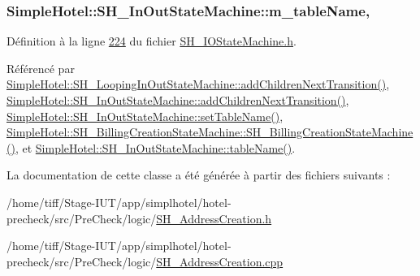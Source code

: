 \hypertarget{classSimpleHotel_1_1SH__InOutStateMachine_a15c063debdaa4c87bd4925867a13ce9e}{
\subsubsection[{m\-\_\-table\-Name}]{\setlength{\rightskip}{0pt plus 5cm}Simple\-Hotel\-::\-S\-H\-\_\-\-In\-Out\-State\-Machine\-::m\-\_\-table\-Name\hspace{0.3cm}{\ttfamily [protected]}, {\ttfamily [inherited]}}}\label{classSimpleHotel_1_1SH__InOutStateMachine_a15c063debdaa4c87bd4925867a13ce9e}


Définition à la ligne \hyperlink{SH__IOStateMachine_8h_source_l00224}{224} du fichier \hyperlink{SH__IOStateMachine_8h_source}{S\-H\-\_\-\-I\-O\-State\-Machine.\-h}.



Référencé par \hyperlink{classSimpleHotel_1_1SH__LoopingInOutStateMachine_a2ac2ff43d97fd1b12e1b30d6818f33e4}{Simple\-Hotel\-::\-S\-H\-\_\-\-Looping\-In\-Out\-State\-Machine\-::add\-Children\-Next\-Transition()}, \hyperlink{classSimpleHotel_1_1SH__InOutStateMachine_aaf5afe04d6e4d3d5ebf0b5f1b00eddf1}{Simple\-Hotel\-::\-S\-H\-\_\-\-In\-Out\-State\-Machine\-::add\-Children\-Next\-Transition()}, \hyperlink{classSimpleHotel_1_1SH__InOutStateMachine_adae23a212e9ba1e590f062994cd367a6}{Simple\-Hotel\-::\-S\-H\-\_\-\-In\-Out\-State\-Machine\-::set\-Table\-Name()}, \hyperlink{classSimpleHotel_1_1SH__BillingCreationStateMachine_a8c7d39e11d0ced1fd9c27a5550465b86}{Simple\-Hotel\-::\-S\-H\-\_\-\-Billing\-Creation\-State\-Machine\-::\-S\-H\-\_\-\-Billing\-Creation\-State\-Machine()}, et \hyperlink{classSimpleHotel_1_1SH__InOutStateMachine_a9fd170fd458e524ac0629b64d5323a45}{Simple\-Hotel\-::\-S\-H\-\_\-\-In\-Out\-State\-Machine\-::table\-Name()}.



La documentation de cette classe a été générée à partir des fichiers suivants \-:\begin{DoxyCompactItemize}
\item 
/home/tiff/\-Stage-\/\-I\-U\-T/app/simplhotel/hotel-\/precheck/src/\-Pre\-Check/logic/\hyperlink{SH__AddressCreation_8h}{S\-H\-\_\-\-Address\-Creation.\-h}\item 
/home/tiff/\-Stage-\/\-I\-U\-T/app/simplhotel/hotel-\/precheck/src/\-Pre\-Check/logic/\hyperlink{SH__AddressCreation_8cpp}{S\-H\-\_\-\-Address\-Creation.\-cpp}\end{DoxyCompactItemize}
